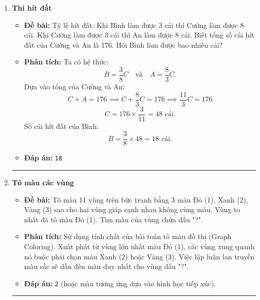 \documentclass[11pt,a4paper]{article}
\begin{document}
\begin{enumerate}[label=\textbf{Câu \arabic*:}, leftmargin=*]
\item \textbf{Thi hít đất}
    \begin{itemize}
        \item \textbf{Đề bài:} Tỷ lệ hít đất: Khi Bình làm được 3 cái thì Cường làm được 8 cái. Khi Cường làm được 3 cái thì An làm được 8 cái. Biết tổng số cái hít đất của Cường và An là 176. Hỏi Bình làm được bao nhiêu cái?
        \item \textbf{Phân tích:}
            Ta có hệ thức:
            $$B = \frac{3}{8}C \quad \text{và} \quad A = \frac{8}{3}C.$$
            Dựa vào tổng của Cường và An:
            $$C + A = 176 \implies C + \frac{8}{3}C = 176 \implies \frac{11}{3}C = 176$$
            $$C = 176 \times \frac{3}{11} = 48\text{ cái}.$$
            Số cái hít đất của Bình:
            $$B = \frac{3}{8} \times 48 = 18\text{ cái}.$$
        \item \textbf{Đáp án:} \texttt{18}
    \end{itemize}

\hrule
\vspace{0.5cm}

\item \textbf{Tô màu các vùng}
    \begin{itemize}
        \item \textbf{Đề bài:} Tô màu 11 vùng trên bức tranh bằng 3 màu Đỏ (1), Xanh (2), Vàng (3) sao cho hai vùng giáp cạnh nhau không cùng màu. Vùng to nhất đã tô màu Đỏ (1). Tìm màu của vùng chứa dấu "?".
        \item \textbf{Phân tích:}
            Sử dụng tính chất của bài toán tô màu đồ thị (Graph Coloring). Xuất phát từ vùng lớn nhất màu Đỏ (1), các vùng xung quanh nó buộc phải chọn màu Xanh (2) hoặc Vàng (3). Việc lập luận lan truyền màu sắc sẽ dẫn đến màu duy nhất cho vùng dấu "?".
        \item \textbf{Đáp án:} \texttt{2} (hoặc màu tương ứng dựa vào hình học tiếp xúc).
    \end{itemize}

\hrule
\vspace{0.5cm}


\end{enumerate}
\end{document}
